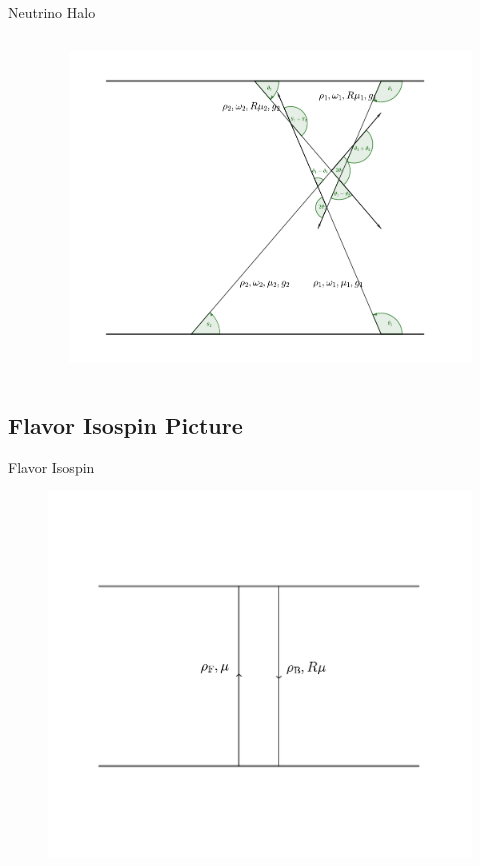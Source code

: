 \documentclass[9pt]{beamer}
\begin{document}
\begin{darkframes}
\begin{frame}{Neutrino Halo}
{\begin{columns}[T]
\begin{column}{0.5\textwidth}
   \end{column}

   \begin{column}{0.5\textwidth}
      \begin{figure}
         \includegraphics[width=\textwidth]{assets/halo-line-model}
      \end{figure}
   \end{column}
\end{columns}


}

\end{frame}

\subsection{Flavor Isospin Picture}

\begin{frame}{Flavor Isospin}


\begin{figure}
   \includegraphics[width=\textwidth]{assets/halo-line-model-single-beam}
\end{figure}



\end{frame}
\end{darkframes}
\end{document}

